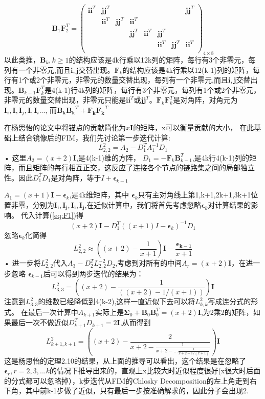 \documentclass[12pt]{article}
\begin{document}
\[
\bm{B}_1\bm{F}_2^T=\left(
\begin{array}{cccccccc}
\bm{i}\bm{i}^T&\bm{j}\bm{j}^T&&&&&&\bm{j}\bm{j}^T\\
&\bm{i}\bm{i}^T&\bm{j}\bm{j}^T&\bm{i}\bm{i}^T&&&&\\
&&&\bm{j}\bm{j}^T&\bm{i}\bm{i}^T&\bm{j}\bm{j}^T&&\\
&&&&&\bm{i}\bm{i}^T&\bm{j}\bm{j}^T&\bm{i}\bm{i}^T\\
\end{array}
\right)_{4\times 8}
\]
以此类推，$\bm{B}_k,k \geq 1$的结构应该是4k行乘以12k列的矩阵，每行有3个非零元，每列有一个非零元,而且$\bm{i},\bm{j}$交替出现。$\bm{F}_k$的结构应该是4k行乘以12(k-1)列的矩阵，每行有1个或2个非零元，非零元的数量交替出现，每列有一个非零元,而且$\bm{i},\bm{j}$交替出现。$\bm{B}_{k-1}\bm{F}_k^T$是4(k-1)行4k列的矩阵，每行有3个非零元，每列有1个或2个非零元，非零元的数量交替出现，非零元只能是$\bm{i}\bm{i}^T$或$\bm{j}\bm{j}^T$。$\bm{F}_k\bm{F}_k^T$是对角阵，对角元为$\bm{I}_i,\bm{I},\bm{I}_j,\bm{I},\bm{I}_i...$,
而$\bm{B_k}\bm{B_k}^T+\bm{F_k}\bm{F_k}^T$


在杨思怡的论文中将锚点的贡献简化为$x\bm{I}$的矩阵，x可以衡量贡献的大小，
在此基础上结合镜像后的FIM，我们先讨论第一步迭代计算:
\begin{equation}\label{eq:F1}
L_{2,2}^2=A_2-D_1^TA_1^{-1}D_1
\end{equation}•
这里$A_2=(x+2)\bm{I}$,是4(k-1)维的方阵，
$D_1=-\bm{F}_k\bm{B}_{k-1}^T$,是4k行4(k-1)列的矩阵，而且矩阵的每行相互正交，这反应了连接各个节点的链路集之间的局部独立性。因此$D_1^TD_1$是对角阵，等于$I+\bm{\epsilon}_{k-1}$

$A_1=(x+1)\bm{I}-\bm{\epsilon}_k$,是4k维矩阵，其中
$\bm{\epsilon}_k$只有主对角线上第1,k+1,2k+1,3k+1位置非零，分别为$\bm{I_i},\bm{I_j},\bm{I_i},\bm{I_j}$,在近似计算中，我们将首先考虑忽略$\bm{\epsilon}_k$对计算结果的影响。
代入计算(\ref{eq:F1})得
\begin{equation}
(x+2)\bm{I}-D_1^T((x+1)I-\bm{\epsilon}_k)^{-1}D_1
\end{equation}
忽略$\bm{\epsilon}_k$化简得
\begin{equation}
L_{2,2}^2 \approx ((x+2)-\frac{1}{x+1})\bm{I}-\frac{\bm{\epsilon_{k-1}}}{x+1}
\end{equation}•
进一步将$L_{2,2}^2$代入$A_3-D_2^TL^{-2}_{2,2}D_2$,考虑到对所有的中间$A_r=(x+2)\bm{I}$，在进一步忽略
$\bm{\epsilon}_{k-1}$后可以得到两步迭代的结果为：
\begin{equation}
L_{3,3}^2=((x+2)-\frac{1}{((x+2)-1/(x+1))})\bm{I}
\end{equation}
注意到$L_{3,3}^2$的维数已经降低到4(k-2),这样一直近似下去可以将$L_{k,k}^2$写成连分式的形式。
在最后一次计算中$A_{k+1}$实际上是$\bm{\Sigma}_0+\bm{B}_0\bm{B}_0^T=(x+2)\bm{I}$,为2乘2的矩阵，如果最后一次不做近似$D_{k+1}^TD_{k+1}=2\bm{I}$,从而得到
\begin{equation}
L_{k+1,k+1}^2=((x+2)-\frac{2}{x+2-\frac{1}{x+2-...\frac{1}{x+2-1/(x+1)}}})\bm{I}
\end{equation}
这是杨思怡的定理2.10的结果，从上面的推导可以看出，这个结果是在忽略了$\bm{\epsilon}_r,r=2,3,...k$的情况下推导出来的，直观上x比较大时近似程度很好(x很大时后面的分式都可以忽略掉），k步迭代从FIM的Chlosky Decomposition的左上角走到右下角，其中前k-1步做了近似，只有最后一步按准确解求的，因此分子会出现2.
\end{document}
